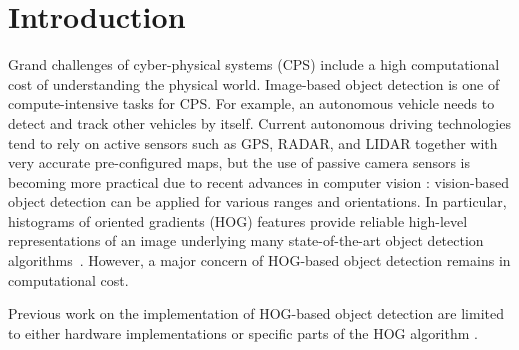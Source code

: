 \section{Introduction}
\label{sec:introduction}

Grand challenges of cyber-physical systems (CPS) include a high
computational cost of understanding the physical world.
Image-based object detection is one of compute-intensive tasks for CPS.
For example, an autonomous vehicle needs to detect and track other
vehicles by itself.
Current autonomous driving technologies \cite{Guizzo11, Levinson11,
Urmson08} tend to rely on active sensors such as GPS, RADAR, and LIDAR
\cite{Kirchner00, Streller02} together with very accurate pre-configured
maps, but the use of passive camera sensors is becoming more practical
due to recent advances in computer vision \cite{Dalal05, Felzenszwalb05,
Felzenszwalb10}: vision-based object detection can be applied for
various ranges and orientations.
In particular, histograms of oriented gradients (HOG) \cite{Dalal05}
features provide reliable high-level representations of an image
underlying many state-of-the-art object detection
algorithms~\cite{Felzenszwalb10, Geiger12, Rybski10, Suard06, Zhu06}.
However, a major concern of HOG-based object detection remains in
computational cost.

Previous work on the implementation of HOG-based object detection are
limited to either hardware implementations \cite{Kadota09, Karakaya09,
Komorkiewicz12} or specific parts of the HOG algorithm \cite{Chen11,
Prisacariu09}.
